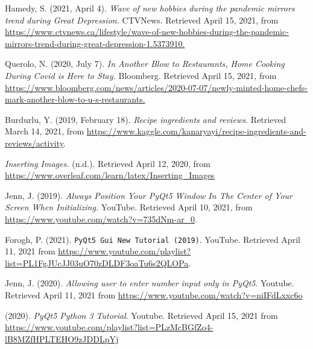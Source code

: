 \documentclass[fontsize=11pt]{article}
\begin{document}
    \begin{thebibliography}{}

        Hamedy, S. (2021, April 4). \textit{Wave of new hobbies during the pandemic mirrors trend during Great Depression.} CTVNews. Retrieved April 15, 2021, from \url{https://www.ctvnews.ca/lifestyle/wave-of-new-hobbies-during-the-pandemic-mirrors-trend-during-great-depression-1.5373910.}

        Querolo, N. (2020, July 7). \textit{In Another Blow to Restaurants, Home Cooking During Covid is Here to Stay.} Bloomberg. Retrieved April 15, 2021, from \url{https://www.bloomberg.com/news/articles/2020-07-07/newly-minted-home-chefs-mark-another-blow-to-u-s-restaurants.}

        Burdurlu, Y. (2019, February 18). \textit{Recipe ingredients and reviews.} Retrieved March 14, 2021,
        from \url{https://www.kaggle.com/kanaryayi/recipe-ingredients-and-reviews/activity}.

        \textit{Inserting Images.} (n.d.). Retrieved April 12, 2020, from \url{https://www.overleaf.com/learn/latex/Inserting_Images}

        Jenn, J. (2019). \textit{Always Position Your PyQt5 Window In The Center of Your Screen When Initializing.} YouTube. Retrieved April 10, 2021, from \url{https://www.youtube.com/watch?v=735dNm-ar_0}.

        Forogh, P. (2021). \texttt{PyQt5 Gui New Tutorial (2019)}. YouTube. Retrieved April 11, 2021 from \url{https://www.youtube.com/playlist?list=PL1FgJUcJJ03uO70zDLDF3oaTu6s2QLOPa}.

        Jenn, J. (2020). \textit{Allowing user to enter number input only in PyQt5}. Youtube. Retrieved April 11, 2021 from \url{https://www.youtube.com/watch?v=niIFdLxxc6o}

        (2020). \textit{PyQt5 Python 3 Tutorial}. Youtube. Retrieved April 15, 2021 from \url{https://www.youtube.com/playlist?list=PLzMcBGfZo4-lB8MZfHPLTEHO9zJDDLpYj}

    \end{thebibliography}


\end{document}
